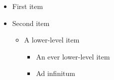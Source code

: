 \documentclass{article}
\begin{document}
	\begin{itemize}
		\item First item
		\item Second item
		\begin{itemize}
			\item A lower-level item
			\begin{itemize}
				\item An ever lower-level item
				\item Ad infinitum
			\end{itemize}
		\end{itemize}
	\end{itemize}
\end{document}
